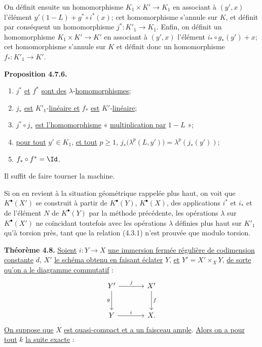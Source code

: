 
On
définit ensuite un homomorphisme \(K_1\times K'\to K_1\) en associant à \((y',x)\) l'élément \(y'(1-L)+g^*\circ i^*(x)\); cet homomorphisme s'annule sur \(K\), et définit par conséquent un homomorphisme \(j^*:K'_1\longrightarrow K_1\). Enfin, on définit un homomorphisme \(K_1\times K'\to K'\) en associant à \((y',x)\) l'élément \(i_*\circ g_*(y')+x\); cet homomorphisme s'annule sur \(K\) et définit donc un homomorphisme \(f_*:K'_1\longrightarrow K'\).

\textbf{Proposition 4.7.6.}
\begin{enumerate}[label=\roman*)]
\item \(j^*\) \uline{et} \(f^*\) \uline{sont des} \(\lambda\)-\uline{homomorphismes};
\item \(j_*\) \uline{est} \(K'_1\)-\uline{linéaire et} \(f_*\) \uline{est} \(K'\)-\uline{linéaire};
\item \(j^*\circ j_*\) \uline{est l'homomorphisme} « \uline{multiplication par} \(1-L\) »;
\item \uline{pour tout} \(y'\in K_1\), \uline{et tout} \(p\ge1\), \(j_*\bigl(\lambda^p(L,y')\bigr)=\lambda^p(j_*(y'))\);
\item \(f_*\circ f^*=\Id\).
\end{enumerate}

Il suffit de faire tourner la machine.

Si on en revient à la situation géométrique rappelée plus haut, on voit que \(K^{\bullet}(X')\) se construit à partir de \(K^{\bullet}(Y)\), \(K^{\bullet}(X)\), des applications \(i^*\) et \(i_*\) et de l'élément \(N\) de \(K^{\bullet}(Y)\) par la méthode précédente, les opérations \(\lambda\) sur \(K^{\bullet}(X')\) ne coïncidant toutefois avec les opérations \(\lambda\) définies plus haut sur \(K'_1\) qu'à torsion près, tant que la relation (4.3.1) n'est prouvée que modulo torsion.

\textbf{Théorème 4.8.} \uline{Soient} \(i:Y\to X\) \uline{une immersion fermée régulière de codimension constante} \(d\), \(X'\) \uline{le schéma obtenu en faisant éclater} \(Y\), \uline{et} \(Y'=X'\times_XY\), \uline{de sorte qu'on a le diagramme commutatif} :
\[
\begin{tikzcd}[column sep=large,row sep=large]
Y' \arrow[r,"j"] \arrow[d,"g"'] & X' \arrow[d,"f"]\\
Y \arrow[r,"i"] & X.
\end{tikzcd}
\]
\uline{On suppose que} \(X\) \uline{est quasi-compact et a un faisceau ample}. \uline{Alors on a pour tout} \(k\) \uline{la suite
exacte} :
